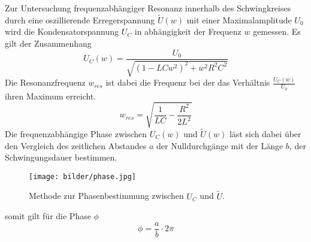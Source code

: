 Zur Untersuchung frequenzabhängiger Resonanz innerhalb des Schwingkreises durch
eine oszillierende Erregerspannung $\tilde{U}(w)$ mit einer Maximalamplitude $U_0$
wird die Kondensatorspannung $U_C$ in abhängigkeit der Frequenz $w$ gemessen.
Es gilt der Zusammenhang
\begin{equation}
    U_C(w)=\frac{U_0}{\sqrt{(1-LCw^2)^2+w^2R^2C^2}}
\end{equation}
Die Resonanzfrequenz $w_{res}$ ist dabei die Frequenz bei der das Verhältnis 
$\frac{U_C(w)}{U_0}$ ihren Maximum erreicht.
\begin{equation}
    w_{res}=\sqrt{\frac{1}{LC}-\frac{R^2}{2L^2}}
\end{equation}
\newpage
Die frequenzabhängige Phase zwischen $U_C(w)$ und $\tilde{U}(w)$ läst sich
dabei über den Vergleich des zeitlichen Abstandes $a$ der Nulldurchgänge 
mit der Länge $b$, der Schwingungsdauer bestimmen.
\begin{figure}
    \centering
    \texttt{[image: bilder/phase.jpg]}
    \caption{Methode zur Phasenbestimmung zwischen $U_C$ und $\tilde{U}$.\cite[282]{Anleitung2}}
\end{figure}
somit gilt für die Phase $\phi$
\begin{equation}
    \phi = \frac{a}{b}\cdot 2\pi
\end{equation}


\label{sec:theorie}